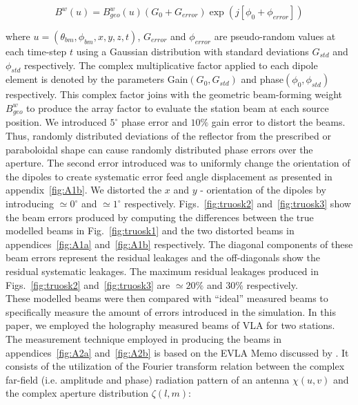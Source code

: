 \documentclass[fleqn,usenatbib]{mnras}
\begin{document}
\begin{equation} B^{w}(u) =  B_{geo}^{w}(u)(G_{0} + G_{error})\exp(j\left[\phi_{0} + \phi_{error}\right]) \label{eq:q11} \end{equation} 

\noindent
where $u = (\theta_{bm}, \phi_{bm}, x, y, z, t)$, $G_{error}$ and $\phi_{error}$ are pseudo-random values at each time-step $t$ using a Gaussian distribution with standard deviations $G_{std}$ and $\phi_{std}$ respectively. The complex multiplicative factor applied to each dipole element is denoted by the parameters Gain$(G_{0}, G_{std})$ and phase$(\phi_{0}, \phi_{std})$ respectively. This complex factor joins with the geometric beam-forming weight $B_{geo}^{w}$ to produce the array factor to evaluate the station beam at each source position. We introduced $5^\circ$ phase error and $10 \%$ gain error to distort the beams. Thus, randomly distributed deviations of the reflector from the prescribed or paraboloidal shape can cause randomly distributed phase errors over the aperture. The second error introduced was to uniformly change the orientation of the dipoles to create systematic error feed angle displacement as presented in  appendix~\ref{fig:A1b}. We distorted the $x$ and $y$ - orientation of the dipoles by introducing $\simeq 0^\circ$ and $\simeq 1^\circ$ respectively. Figs.~\ref{fig:truosk2} and~\ref{fig:truosk3} show the beam errors produced by computing the differences between the true modelled beams in Fig.~\ref{fig:truosk1} and the two distorted beams in appendices~\ref{fig:A1a} and~\ref{fig:A1b} respectively. The diagonal components of these beam errors represent the residual leakages and the off-diagonals show the residual systematic leakages. The maximum residual leakages produced in Figs.~\ref{fig:truosk2} and~\ref{fig:truosk3} are $\simeq 20 \%$ and $30 \%$ respectively. \\

\noindent
These modelled beams were then compared with ``ideal'' measured beams to specifically measure the amount of errors introduced in the simulation. In this paper, we employed the holography measured beams of VLA for two stations. The measurement technique employed in producing the beams in appendices~\ref{fig:A2a} and~\ref{fig:A2b} is based on the EVLA Memo discussed by \citet{2015Rick}. It consists of the utilization of the Fourier transform relation between the complex far-field (i.e. amplitude and phase) radiation pattern of an antenna $\chi(u, v)$ and the complex aperture distribution $\zeta(l, m)$:
\end{document}
